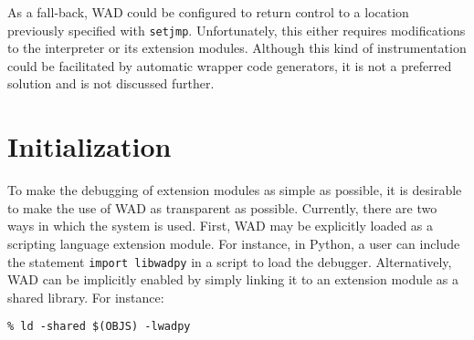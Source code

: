 
As a fall-back, WAD could be configured to return control to a location
previously specified with {\tt setjmp}.  Unfortunately, this either
requires modifications to the interpreter or its extension modules.
Although this kind of instrumentation could be facilitated by automatic
wrapper code generators, it is not a preferred solution and is
not discussed further.

\section{Initialization}

To make the debugging of extension modules as simple as possible, it
is desirable to make the use of WAD as transparent as possible.
Currently, there are two ways in which the system is used.  First, WAD
may be explicitly loaded as a scripting language extension module.
For instance, in Python, a user can include the statement {\tt import
libwadpy} in a script to load the debugger.  Alternatively, WAD can be
implicitly enabled by simply linking it to an extension module as a shared
library.  For instance:

\begin{verbatim}
% ld -shared $(OBJS) -lwadpy
\end{verbatim}

